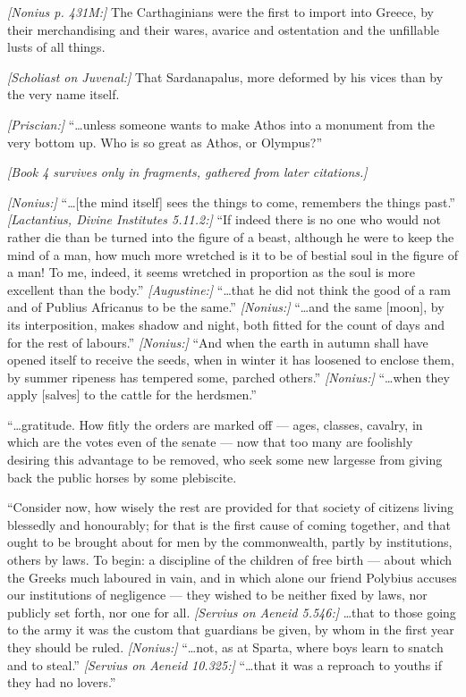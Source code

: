  \textit{[Nonius p. 431M:]} The Carthaginians were the first to import into Greece, by their merchandising and their wares, avarice and ostentation and the unfillable lusts of all things.

 \textit{[Scholiast on Juvenal:]} That Sardanapalus, more deformed by his vices than by the very name itself.

 \textit{[Priscian:]} ``\ldots unless someone wants to make Athos into a monument from the very bottom up. Who is so great as Athos, or Olympus?''


\noindent\textit{[Book 4 survives only in fragments, gathered from later citations.]}

 \textit{[Nonius:]} ``\ldots [the mind itself] sees the things to come, remembers the things past.'' \textit{[Lactantius, Divine Institutes 5.11.2:]} ``If indeed there is no one who would not rather die than be turned into the figure of a beast, although he were to keep the mind of a man, how much more wretched is it to be of bestial soul in the figure of a man! To me, indeed, it seems wretched in proportion as the soul is more excellent than the body.'' \textit{[Augustine:]} ``\ldots that he did not think the good of a ram and of Publius Africanus to be the same.'' \textit{[Nonius:]} ``\ldots and the same [moon], by its interposition, makes shadow and night, both fitted for the count of days and for the rest of labours.'' \textit{[Nonius:]} ``And when the earth in autumn shall have opened itself to receive the seeds, when in winter it has loosened to enclose them, by summer ripeness has tempered some, parched others.'' \textit{[Nonius:]} ``\ldots when they apply [salves] to the cattle for the herdsmen.''

 ``\ldots gratitude. How fitly the orders are marked off --- ages, classes, cavalry, in which are the votes even of the senate --- now that too many are foolishly desiring this advantage to be removed, who seek some new largesse from giving back the public horses by some plebiscite.

 ``Consider now, how wisely the rest are provided for that society of citizens living blessedly and honourably; for that is the first cause of coming together, and that ought to be brought about for men by the commonwealth, partly by institutions, others by laws. To begin: a discipline of the children of free birth --- about which the Greeks much laboured in vain, and in which alone our friend Polybius accuses our institutions of negligence --- they wished to be neither fixed by laws, nor publicly set forth, nor one for all. \textit{[Servius on Aeneid 5.546:]} \ldots that to those going to the army it was the custom that guardians be given, by whom in the first year they should be ruled. \textit{[Nonius:]} ``\ldots not, as at Sparta, where boys learn to snatch and to steal.'' \textit{[Servius on Aeneid 10.325:]} ``\ldots that it was a reproach to youths if they had no lovers.''


